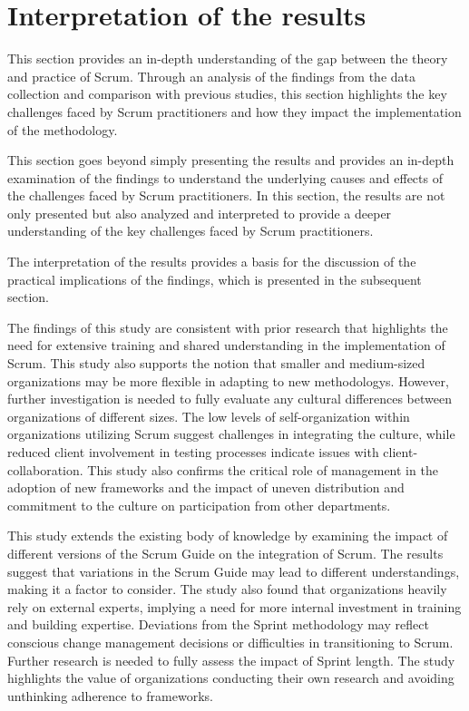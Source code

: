 \section{Interpretation of the results}\label{sec:Interpretationoftheresults}
This section provides an in-depth understanding of the gap between the theory and practice of Scrum. Through an analysis of the findings from the data collection and comparison with previous studies, this section highlights the key challenges faced by Scrum practitioners and how they impact the implementation of the \gls{methodology}.

This section goes beyond simply presenting the results and provides an in-depth examination of the findings to understand the underlying causes and effects of the challenges faced by Scrum practitioners. In this section, the results are not only presented but also analyzed and interpreted to provide a deeper understanding of the key challenges faced by Scrum practitioners.

The interpretation of the results provides a basis for the discussion of the practical implications of the findings, which is presented in the subsequent section.

The findings of this study are consistent with prior research that highlights the need for extensive training and shared understanding in the implementation of Scrum. This study also supports the notion that smaller and medium-sized organizations may be more flexible in adapting to new \glspl{methodology}. However, further investigation is needed to fully evaluate any cultural differences between organizations of different sizes. The low levels of self-organization within organizations utilizing Scrum suggest challenges in integrating the culture, while reduced \gls{client} involvement in testing processes indicate issues with client-collaboration. This study also confirms the critical role of management in the \gls{adoption} of new \glspl{framework} and the impact of uneven distribution and \gls{commitment} to the culture on participation from other departments.

This study extends the existing body of knowledge by examining the impact of different versions of the Scrum Guide on the integration of Scrum. The results suggest that variations in the Scrum Guide may lead to different understandings, making it a factor to consider. The study also found that organizations heavily rely on external experts, implying a need for more internal investment in training and building expertise. Deviations from the Sprint \gls{methodology} may reflect conscious change management decisions or difficulties in transitioning to Scrum. Further research is needed to fully assess the impact of Sprint length. The study highlights the value of organizations conducting their own research and avoiding unthinking adherence to \glspl{framework}.

